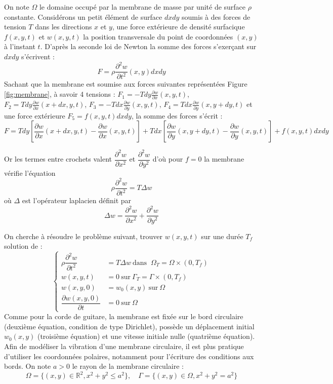 \documentclass[a4,12pt]{article}
\newcommand{\R}{\mathbb{R}}
\begin{document}
	    On note $\Omega$ le domaine occupé par la membrane de masse par unité de surface $\rho$ constante. Considérons un petit élément de surface $dxdy$ soumis à des forces de tension $T$  dans les directions $x$ et $y$, une force extérieure de densité surfacique $f(x,y,t)$ et $w(x,y,t)$ la position transversale du point de coordonnées $(x,y)$ à l'instant $t$. D'après la seconde loi de Newton la somme des forces s'exerçant sur $dxdy$ s'écrivent : 
	    \[
	      F=\rho  \frac{\partial^2 w}{\partial t^2}(x,y)dxdy
	    \]
	    Sachant que la membrane est soumise aux forces suivantes représentées Figure \ref{fig:membrane}, à savoir 4 tensions : $F_1=-Tdy\frac{\partial w}{\partial x}(x,y,t)$, $F_2=Tdy\frac{\partial w}{\partial x}(x+dx,y,t)$, $F_3=-Tdx\frac{\partial w}{\partial y}(x,y,t)$, $F_4=Tdx\frac{\partial w}{\partial y}(x,y+dy,t)$ et une force extérieure $F_5=f(x,y,t)dxdy$, la somme des forces s'écrit : 
	    \[
	      F=Tdy\left[\frac{\partial w}{\partial x}(x+dx,y,t)-\frac{\partial w}{\partial x}(x,y,t)\right]+Tdx\left[\frac{\partial w}{\partial y}(x,y+dy,t)-\frac{\partial w}{\partial y}(x,y,t)\right]+f(x,y,t)dxdy
	    \]

	    Or les termes entre crochets valent $\dfrac{\partial^2 w}{\partial x^2}$ et $\dfrac{\partial^2 w}{\partial y^2}$ d'où pour $f=0$ la membrane vérifie l'équation 
	    \[
	      \rho \dfrac{\partial^2 w}{\partial t^2}=T \Delta w
	    \]
	    où $\Delta$ est l'opérateur laplacien définit par 
	    \[
	      \Delta w=\dfrac{\partial^2 w}{\partial x^2}+\dfrac{\partial^2 w}{\partial y^2}
	    \]

	    On cherche à résoudre le problème suivant, trouver $w(x,y,t)$ sur une durée $T_f$ solution de :
	    \begin{equation}
	      \left\{
		\begin{array}{rl}
		  \rho \dfrac{\partial^2 w}{\partial t^2} & =  T \Delta w ~\textrm{dans } ~ \Omega_T = \Omega \times (0,T_f)\\ 
		  w(x,y,t)& =  0 ~\textrm{sur} ~ \Gamma_T=\Gamma \times (0,T_f)\\
		  w(x,y,0)& = w_0(x,y) ~ \textrm{sur} ~\Omega \\
		  \dfrac{\partial w(x,y,0)}{\partial t} & = 0 ~\textrm{sur} ~\Omega 
		\end{array}
		\right.
		\label{eq:membranemodel}
	      \end{equation}
	      Comme pour la corde de guitare, la membrane est fixée sur le bord circulaire (deuxième équation, condition de type Dirichlet), possède un déplacement initial $w_0(x,y)$ (troisième équation) et une vitesse initiale nulle (quatrième équation). Afin de modéliser la vibration d'une membrane circulaire, il est plus pratique d'utiliser les coordonnées polaires, notamment pour l'écriture des conditions aux bords. On note $a>0$ le rayon de la membrane circulaire : 
	      \[
		\Omega=\{(x,y)\in \R^2, x^2+y^2 \leq a^2\}, \quad \Gamma=\{(x,y)\in \Omega,  x^2+y^2 = a^2\}
	      \]
\end{document}
